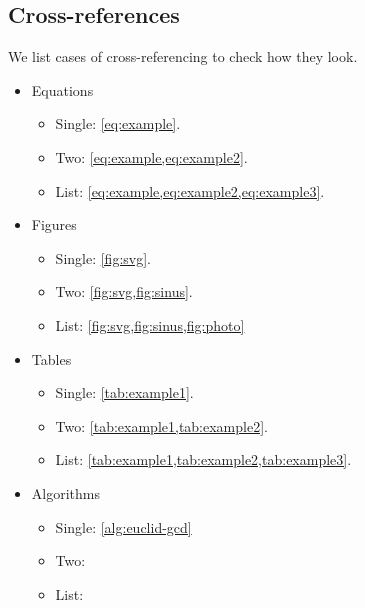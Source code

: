 \subsection{Cross-references}
We list cases of cross-referencing to check how they look.

\begin{itemize}
\item Equations
\begin{itemize}
  \item Single: \cref{eq:example}.
  \item Two: \cref{eq:example,eq:example2}.
  \item List: \cref{eq:example,eq:example2,eq:example3}.
\end{itemize}
\item Figures
\begin{itemize}
  \item Single: \cref{fig:svg}.
  \item Two: \cref{fig:svg,fig:sinus}.
  \item List: \cref{fig:svg,fig:sinus,fig:photo}
\end{itemize}
\item Tables
\begin{itemize}
  \item Single: \cref{tab:example1}.
  \item Two: \cref{tab:example1,tab:example2}.
  \item List: \cref{tab:example1,tab:example2,tab:example3}.
\end{itemize}
\item Algorithms
\begin{itemize}
  \item Single: \cref{alg:euclid-gcd}
  \item Two:
  \item List:
\end{itemize}
\end{itemize}

